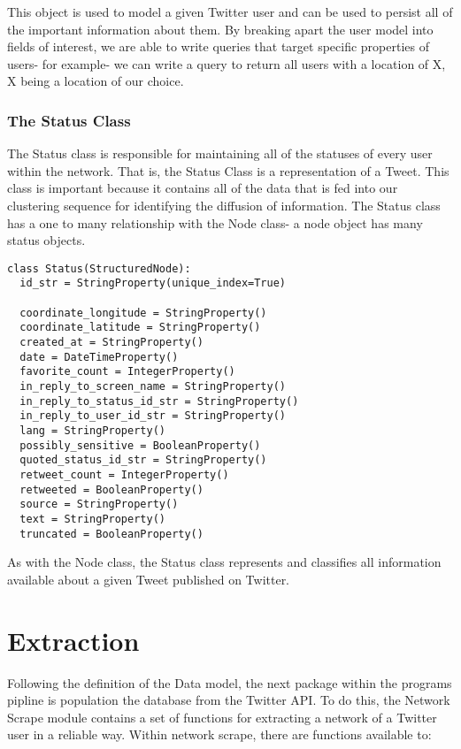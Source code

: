 This object is used to model a given Twitter user and can be used to
persist all of the important information about them. By breaking apart
the user model into fields of interest, we are able to write queries
that target specific properties of users- for example- we can write a
query to return all users with a location of X, X being a location of
our choice.

\subsubsection{The  Status Class}
The Status class is responsible for maintaining all of the statuses of
every user within the network. That is, the Status Class is a
representation of a Tweet. This class is important because it contains
all of the data that is fed into our clustering sequence for
identifying the diffusion of information. The Status class has a one
to many relationship with the Node class- a node object has many
status objects.

\begin{lstlisting}
class Status(StructuredNode):
  id_str = StringProperty(unique_index=True)

  coordinate_longitude = StringProperty()
  coordinate_latitude = StringProperty()
  created_at = StringProperty()
  date = DateTimeProperty()
  favorite_count = IntegerProperty()
  in_reply_to_screen_name = StringProperty()
  in_reply_to_status_id_str = StringProperty()
  in_reply_to_user_id_str = StringProperty()
  lang = StringProperty()
  possibly_sensitive = BooleanProperty()
  quoted_status_id_str = StringProperty()
  retweet_count = IntegerProperty()
  retweeted = BooleanProperty()
  source = StringProperty()
  text = StringProperty()
  truncated = BooleanProperty()
\end{lstlisting}

As with the Node class, the Status class represents and classifies all
information available about a given Tweet published on Twitter.

\section{Extraction}
Following the definition of the Data model, the next package within
the programs pipline is population the database from the Twitter API.
To do this, the Network Scrape module contains a set of functions for
extracting a network of a Twitter user in a reliable way. Within
network scrape, there are functions available to:

